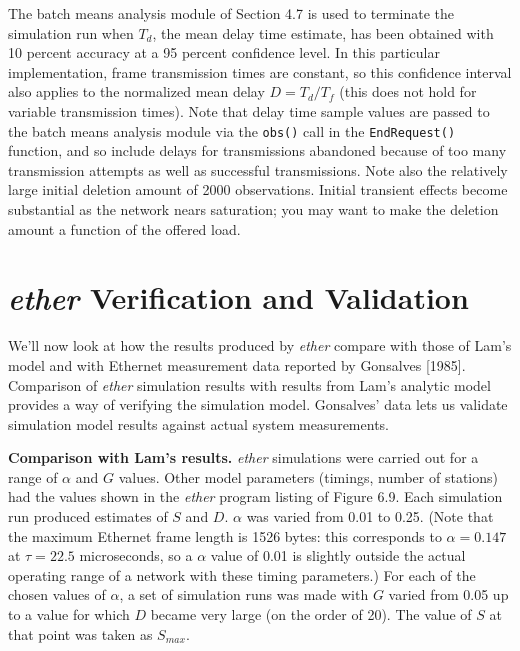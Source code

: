 The batch means analysis module of Section 4.7 is used to terminate the simulation run when $T_d$, the mean delay time estimate, has been obtained with 10 percent accuracy at a 95 percent confidence level. In this particular implementation, frame transmission times are constant, so this confidence interval also applies to the normalized mean delay $D=T_d/T_f$ (this does not hold for variable transmission times). Note that delay time sample values are passed to the batch means analysis module via the \texttt{obs()} call in the \texttt{EndRequest()} function, and so include delays for transmissions abandoned because of too many transmission attempts as well as successful transmissions. Note also the relatively large initial deletion amount of 2000 observations. Initial transient effects become substantial as the network nears saturation; you may want to make the deletion amount a function of the offered load.

\section{\emph{ether} Verification and Validation}

We'll now look at how the results produced by \emph{ether} compare with those of Lam's model and with Ethernet measurement data reported by Gonsalves [1985]. Comparison of \emph{ether} simulation results with results from Lam's analytic model provides a way of verifying the simulation model. Gonsalves' data lets us validate simulation model results against actual system measurements.

\noindent\textbf{Comparison with Lam's results.} \emph{ether} simulations were carried out for a range of $\alpha$ and $G$ values. Other model parameters (timings, number of stations) had the values shown in the \emph{ether} program listing of Figure 6.9. Each simulation run produced estimates of $S$ and $D$. $\alpha$ was varied from 0.01 to 0.25. (Note that the maximum Ethernet frame length is 1526 bytes: this corresponds to $\alpha=0.147$ at $\tau=22.5$ microseconds, so a $\alpha$ value of 0.01 is slightly outside the actual operating range of a network with these timing parameters.) For each of the chosen values of $\alpha$, a set of simulation runs was made with $G$ varied from 0.05 up to a value for which $D$ became very large (on the order of 20). The value of $S$ at that point was taken as $S_{max}$.

